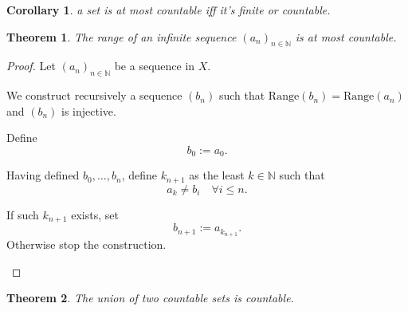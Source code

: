 \documentclass[10pt,a4paper]{book}
\newtheorem{theorem}{Theorem}[section]
\newtheorem{corollary}{Corollary}[section]
\begin{document}
\begin{corollary} a set is at most countable iff it's finite or countable.
\end{corollary}

\begin{theorem}
    The range of an infinite sequence $(a_n)_{n\in\mathbb N}$ is at most countable.
\end{theorem}

\begin{proof}

    Let $(a_n)_{n\in\mathbb N}$ be a sequence in $X$.

    We construct recursively a sequence $(b_n)$ such that
    $\mathrm{Range}(b_n)=\mathrm{Range}(a_n)$ and $(b_n)$ is injective.

    Define
    \[
        b_0 := a_0.
    \]

    Having defined $b_0,\dots,b_n$, define $k_{n+1}$ as the least $k\in\mathbb N$
    such that
    \[
        a_k \neq b_i \quad \forall i\le n.
    \]

    If such $k_{n+1}$ exists, set
    \[
        b_{n+1} := a_{k_{n+1}}.
    \]
    Otherwise stop the construction.

    \begin{fitchproof}[arrayenv=tabular]


        \open
        \close







    \end{fitchproof}

\end{proof}

\begin{theorem}
    The union of two countable sets is countable.
\end{theorem}
\end{document}
